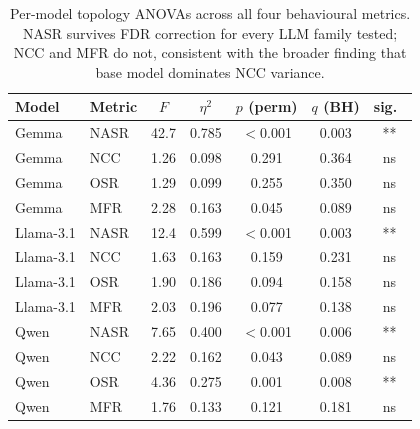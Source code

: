 \documentclass[11pt]{article}
\begin{document}
\begin{table}[h]
\centering
\small
\begin{tabular}{llccccc}
\toprule
Model & Metric & $F$ & $\eta^2$ & $p$ (perm) & $q$ (BH) & sig.\ \\
\midrule
Gemma     & NASR & 42.7 & 0.785 & $<$0.001 & 0.003 & ** \\
Gemma     & NCC  & 1.26 & 0.098 & 0.291    & 0.364 & ns \\
Gemma     & OSR  & 1.29 & 0.099 & 0.255    & 0.350 & ns \\
Gemma     & MFR  & 2.28 & 0.163 & 0.045    & 0.089 & ns \\
Llama-3.1 & NASR & 12.4 & 0.599 & $<$0.001 & 0.003 & ** \\
Llama-3.1 & NCC  & 1.63 & 0.163 & 0.159    & 0.231 & ns \\
Llama-3.1 & OSR  & 1.90 & 0.186 & 0.094    & 0.158 & ns \\
Llama-3.1 & MFR  & 2.03 & 0.196 & 0.077    & 0.138 & ns \\
Qwen      & NASR & 7.65 & 0.400 & $<$0.001 & 0.006 & ** \\
Qwen      & NCC  & 2.22 & 0.162 & 0.043    & 0.089 & ns \\
Qwen      & OSR  & 4.36 & 0.275 & 0.001    & 0.008 & ** \\
Qwen      & MFR  & 1.76 & 0.133 & 0.121    & 0.181 & ns \\
\bottomrule
\end{tabular}
\caption{Per-model topology ANOVAs across all four behavioural metrics. NASR survives FDR correction for every LLM family tested; NCC and MFR do not, consistent with the broader finding that base model dominates NCC variance.}
\label{tab:phase3_model_anova}
\end{table}
\end{document}
